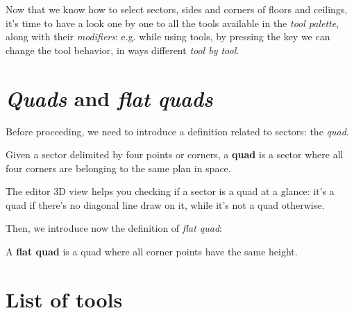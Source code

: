 Now that we know how to select sectors, sides and corners of floors and ceilings, it's time to have a look one by one to all the tools available in the \emph{tool palette}, along with their \emph{modifiers}: e.g. while using tools, by pressing the \keys{\Alt} key we can change the tool behavior, in ways different \emph{tool by tool}.

\section{\emph{Quads} and \emph{flat quads}}

Before proceeding, we need to introduce a definition related to sectors: the \emph{quad}.

\begin{remark}
    Given a sector delimited by four points or corners, a \textbf{quad} is a sector where all four corners are belonging to the same plan in space.
\end{remark}

The editor 3D view helps you checking if a sector is a quad at a glance: it's a quad if there's no diagonal line draw on it, while it's not a quad otherwise.

Then, we introduce now the definition of \emph{flat quad}:

\begin{remark}
    A \textbf{flat quad} is a quad where all corner points have the same height.
\end{remark}

\section{List of tools}

